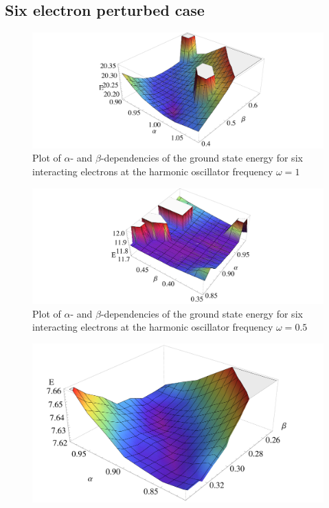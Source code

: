\begin{appendix}
\subsection{Six electron perturbed case}
\begin{figure}
    \centering
    \includegraphics[scale=0.48]{psix1}
    \caption{Plot of $\alpha$- and $\beta$-dependencies of the ground state energy for six interacting electrons at the harmonic oscillator frequency $\omega=1$}
    \label{fig:psix1}
\end{figure}
\begin{figure}
    \centering
    \includegraphics[scale=0.53]{psix05}
    \caption{Plot of $\alpha$- and $\beta$-dependencies of the ground state energy for six interacting electrons at the harmonic oscillator frequency $\omega=0.5$}
    \label{fig:psix05}
\end{figure}
\begin{figure}
    \centering
    \includegraphics[scale=0.35]{psix028}

\end{figure}
\end{appendix}
